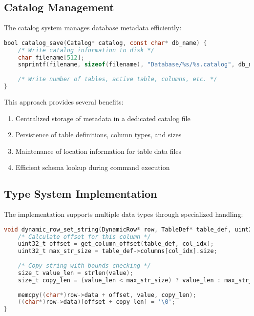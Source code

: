 \documentclass[12pt,a4paper]{article}  %
\begin{document}
\subsection{Catalog Management}

The catalog system manages database metadata efficiently:

\begin{lstlisting}[language=C]
bool catalog_save(Catalog* catalog, const char* db_name) {
    /* Write catalog information to disk */
    char filename[512];
    snprintf(filename, sizeof(filename), "Database/%s/%s.catalog", db_name, db_name);
    
    /* Write number of tables, active table, columns, etc. */
}
\end{lstlisting}

This approach provides several benefits:
\begin{enumerate}
    \item Centralized storage of metadata in a dedicated catalog file
    \item Persistence of table definitions, column types, and sizes
    \item Maintenance of location information for table data files
    \item Efficient schema lookup during command execution
\end{enumerate}

\subsection{Type System Implementation}

The implementation supports multiple data types through specialized handling:

\begin{lstlisting}[language=C]
void dynamic_row_set_string(DynamicRow* row, TableDef* table_def, uint32_t col_idx, const char* value) {
    /* Calculate offset for this column */
    uint32_t offset = get_column_offset(table_def, col_idx);
    uint32_t max_str_size = table_def->columns[col_idx].size;
    
    /* Copy string with bounds checking */
    size_t value_len = strlen(value);
    size_t copy_len = (value_len < max_str_size) ? value_len : max_str_size - 1;
    
    memcpy((char*)row->data + offset, value, copy_len);
    ((char*)row->data)[offset + copy_len] = '\0';
}
\end{lstlisting}
\end{document}

